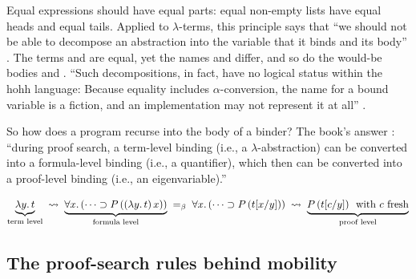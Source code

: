 {{Equal expressions should have equal parts: equal non-empty lists have equal heads and equal tails. Applied to
$\lambda$-terms, this principle says that \enquote{we should not be able to decompose an abstraction into the
variable that it binds and its body} . The terms  and
 are equal, yet the names  and  differ, and so do the would-be
bodies  and . \enquote{Such decompositions, in fact, have no
logical status within the hohh language: Because equality includes $\alpha$-conversion, the name for a bound
variable is a fiction, and an implementation may not represent it at all} .

So how does a program recurse into the body of a binder? The book's answer :
\enquote{during proof search, a term-level binding (i.e., a $\lambda$-abstraction) can be converted into a
formula-level binding (i.e., a quantifier), which then can be converted into a proof-level binding (i.e., an
eigenvariable).}
\begin{fullwidth}
\[
\underbrace{\lambda y.\,t}_{\text{term level}}
\;\rightsquigarrow\;
\underbrace{\forall x.\,(\cdots\supset P\,((\lambda y.\,t)\,x))}_{\text{formula level}}
\;=_\beta\;
\forall x.\,(\cdots\supset P\,(t[x/y]))
\;\rightsquigarrow\;
\underbrace{P\,(t[c/y])\ \text{ with } c \text{ fresh}}_{\text{proof level}}
\]
\end{fullwidth}

\subsection{The proof-search rules behind mobility}

}}
